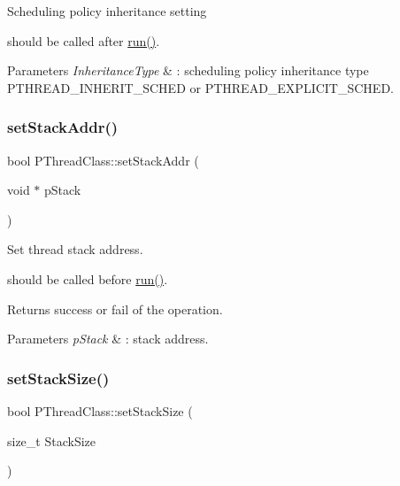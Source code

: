 Scheduling policy inheritance setting

should be called after \hyperlink{classPThreadClass_a9e60b014b8e8ba6892cc322b6ba183d8}{run()}. 
\begin{DoxyParams}{Parameters}
{\em Inheritance\+Type} & \+: scheduling policy inheritance type P\+T\+H\+R\+E\+A\+D\+\_\+\+I\+N\+H\+E\+R\+I\+T\+\_\+\+S\+C\+H\+ED or P\+T\+H\+R\+E\+A\+D\+\_\+\+E\+X\+P\+L\+I\+C\+I\+T\+\_\+\+S\+C\+H\+ED. \\
\hline
\end{DoxyParams}
\mbox{\label{classPThreadClass_a637580a700f744236440695abe689efa}} 
\subsubsection{\texorpdfstring{set\+Stack\+Addr()}{setStackAddr()}}
{\footnotesize\ttfamily bool P\+Thread\+Class\+::set\+Stack\+Addr (\begin{DoxyParamCaption}\item[{void $\ast$}]{p\+Stack }\end{DoxyParamCaption})}

Set thread stack address.

should be called before \hyperlink{classPThreadClass_a9e60b014b8e8ba6892cc322b6ba183d8}{run()}. \begin{DoxyReturn}{Returns}
success or fail of the operation. 
\end{DoxyReturn}

\begin{DoxyParams}{Parameters}
{\em p\+Stack} & \+: stack address. \\
\hline
\end{DoxyParams}
\mbox{\label{classPThreadClass_a25c4ea5d463a772ee3b916621e388bed}} 
\subsubsection{\texorpdfstring{set\+Stack\+Size()}{setStackSize()}}
{\footnotesize\ttfamily bool P\+Thread\+Class\+::set\+Stack\+Size (\begin{DoxyParamCaption}\item[{size\+\_\+t}]{Stack\+Size }\end{DoxyParamCaption})}

